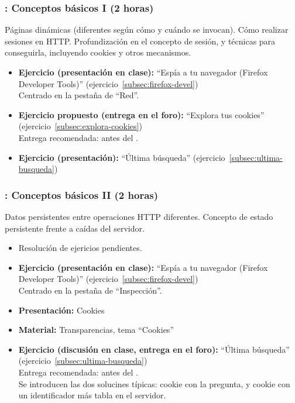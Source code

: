 \documentclass[a4paper,12pt]{article}
\begin{document}
\subsubsection{\juevesB: Conceptos básicos I (2 horas)}
\label{cal:juevesB}

Páginas dinámicas (diferentes según cómo y cuándo se invocan). Cómo realizar sesiones en HTTP. Profundización en el concepto de sesión, y técnicas para conseguirla, incluyendo cookies y otros mecanismos.

\begin{itemize}
\item \textbf{Ejercicio (presentación en clase):} ``Espía a tu navegador (Firefox Developer Tools)'' (ejercicio~\ref{subsec:firefox-devel}) \\
  Centrado en la pestaña de ``Red''.
\item \textbf{Ejercicio propuesto (entrega en el foro):} ``Explora tus cookies'' (ejercicio~\ref{subsec:explora-cookies}) \\
  Entrega recomendada: antes del \juevesC.
\item \textbf{Ejercicio (presentación):} ``Última búsqueda'' (ejercicio~\ref{subsec:ultima-busqueda})
\end{itemize}


\subsubsection{\juevesC: Conceptos básicos II (2 horas)}
\label{cal:juevesC}

Datos persistentes entre operaciones HTTP diferentes. Concepto de estado persistente frente a caídas del servidor.

\begin{itemize}
\item Resolución de ejericios pendientes.
\item \textbf{Ejercicio (presentación en clase):} ``Espía a tu navegador (Firefox Developer Tools)'' (ejercicio~\ref{subsec:firefox-devel}) \\
  Centrado en la pestaña de ``Inspección''.
\item \textbf{Presentación:} Cookies
\item \textbf{Material:} Transparencias, tema ``Cookies''
\item \textbf{Ejercicio (discusión en clase, entrega en el foro):} ``Última búsqueda'' (ejercicio~\ref{subsec:ultima-busqueda}) \\
  Entrega recomendada: antes del \juevesD. \\
  Se introducen las dos solucines típicas: cookie con la pregunta, y cookie con un identificador más tabla en el servidor.
\end{itemize}
\end{document}
